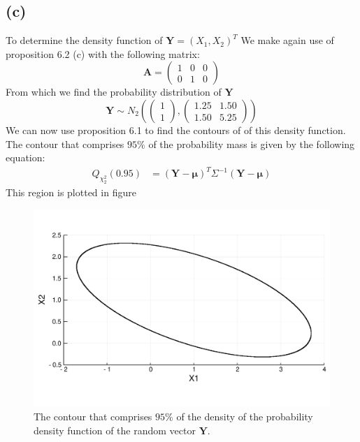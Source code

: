 \documentclass[a4paper]{article}
\begin{document}
\subsection*{(c)}
\noindent {}

To determine the density function of $\mathbf{Y}=(X_1, X_2)^T$ We make again use of proposition 6.2 (c) with the following matrix:
\begin{equation*}
	\mathbf{A} = \begin{pmatrix} 1 & 0 & 0\\ 0 & 1 & 0 \end{pmatrix}
\end{equation*}
From which we find the probability distribution of $\mathbf{Y}$
\begin{equation*}
	\mathbf{Y} \sim N_2\left( \begin{pmatrix}1\\1\end{pmatrix}, \begin{pmatrix}1.25&1.50\\1.50&5.25 \end{pmatrix}\right)
\end{equation*}
We can now use proposition 6.1 to find the contours of of this density function. The contour that comprises $95\%$ of the probability mass is given by the following equation:
\begin{align*}
	Q_{\chi^2_2}(0.95) &= (\mathbf{Y}-\mathbf{\mu})^T \Sigma^{-1} (\mathbf{Y}-\mathbf{\mu})
\end{align*}
This region is plotted in figure
\begin{figure}
	\centering
	\includegraphics[width=.9\linewidth]{region-3c.pdf}
	\caption{The contour that comprises $95\%$ of the density of the probability density function of the random vector $\mathbf{Y}$.}
	\label{fig:4c}
\end{figure}
\end{document}
